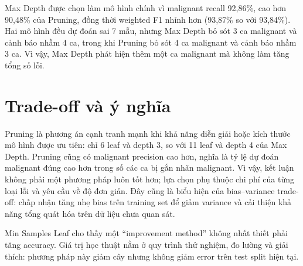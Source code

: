 Max Depth được chọn làm mô hình chính vì malignant recall 92,86\%, cao hơn
90,48\% của Pruning, đồng thời weighted F1 nhỉnh hơn (93,87\% so với 93,84\%).
Hai mô hình đều dự đoán sai 7 mẫu, nhưng Max Depth bỏ sót 3 ca malignant và
cảnh báo nhầm 4 ca, trong khi Pruning bỏ sót 4 ca malignant và cảnh báo nhầm
3 ca. Vì vậy, Max Depth phát hiện thêm một ca malignant mà không làm tăng tổng
số lỗi.

\section{Trade-off và ý nghĩa}

Pruning là phương án cạnh tranh mạnh khi khả năng diễn giải hoặc kích thước mô
hình được ưu tiên: chỉ 6 leaf và depth 3, so với 11 leaf và depth 4 của Max
Depth. Pruning cũng có malignant precision cao hơn, nghĩa là tỷ lệ dự đoán
malignant đúng cao hơn trong số các ca bị gắn nhãn malignant. Vì vậy, kết luận
không phải một phương pháp luôn tốt hơn; lựa chọn phụ thuộc chi phí của từng
loại lỗi và yêu cầu về độ đơn giản. Đây cũng là biểu hiện của bias--variance
trade-off: chấp nhận tăng nhẹ bias trên training set để giảm variance và cải
thiện khả năng tổng quát hóa trên dữ liệu chưa quan sát.

Min Samples Leaf cho thấy một ``improvement method'' không nhất thiết phải tăng
accuracy. Giá trị học thuật nằm ở quy trình thử nghiệm, đo lường và giải thích:
phương pháp này giảm cây nhưng không giảm error trên test split hiện tại.
